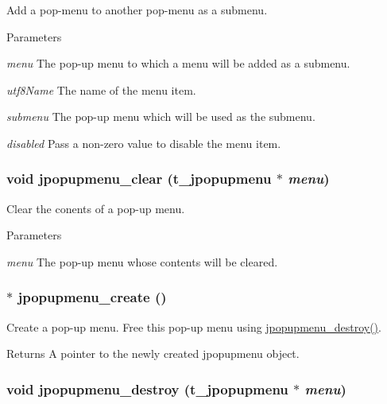 Add a pop-\/menu to another pop-\/menu as a submenu. 
\begin{DoxyParams}{Parameters}
\item[{\em menu}]The pop-\/up menu to which a menu will be added as a submenu. \item[{\em utf8Name}]The name of the menu item. \item[{\em submenu}]The pop-\/up menu which will be used as the submenu. \item[{\em disabled}]Pass a non-\/zero value to disable the menu item. \end{DoxyParams}
\hypertarget{group__jpopupmenu_gaf4f15c09d15aaaa33d149a6109c4aa47}{
\subsubsection[{jpopupmenu\_\-clear}]{\setlength{\rightskip}{0pt plus 5cm}void jpopupmenu\_\-clear ({\bf t\_\-jpopupmenu} $\ast$ {\em menu})}}
\label{group__jpopupmenu_gaf4f15c09d15aaaa33d149a6109c4aa47}


Clear the conents of a pop-\/up menu. 
\begin{DoxyParams}{Parameters}
\item[{\em menu}]The pop-\/up menu whose contents will be cleared. \end{DoxyParams}
\hypertarget{group__jpopupmenu_ga4ee6ff8775c88750bc002db49bdaa98b}{
\subsubsection[{jpopupmenu\_\-create}]{$\ast$ jpopupmenu\_\-create ()}}
\label{group__jpopupmenu_ga4ee6ff8775c88750bc002db49bdaa98b}


Create a pop-\/up menu. Free this pop-\/up menu using \hyperlink{group__jpopupmenu_ga1481bf544273533000b02e31e42df65f}{jpopupmenu\_\-destroy()}.

\begin{DoxyReturn}{Returns}
A pointer to the newly created jpopupmenu object. 
\end{DoxyReturn}
\hypertarget{group__jpopupmenu_ga1481bf544273533000b02e31e42df65f}{
\subsubsection[{jpopupmenu\_\-destroy}]{\setlength{\rightskip}{0pt plus 5cm}void jpopupmenu\_\-destroy ({\bf t\_\-jpopupmenu} $\ast$ {\em menu})}}
\label{group__jpopupmenu_ga1481bf544273533000b02e31e42df65f}


